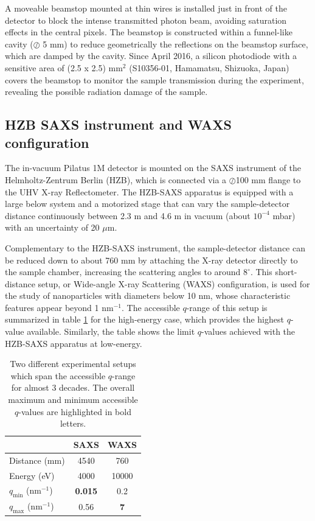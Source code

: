 A moveable beamstop mounted at thin wires is installed just in front of the detector to block the intense transmitted photon beam, avoiding saturation effects in the central pixels. The beamstop is constructed within a funnel-like cavity ($\oslash$ 5 mm) to reduce geometrically the reflections on the beamstop surface, which are damped by the cavity. Since April 2016, a silicon photodiode with a sensitive area of (2.5 x 2.5) mm$^2$ (S10356-01, Hamamatsu, Shizuoka, Japan) covers the beamstop to monitor the sample transmission during the experiment, revealing the possible radiation damage of the sample.

\subsection{HZB SAXS instrument and WAXS configuration}
\label{sec:WAXS_experimental}

The in-vacuum Pilatus 1M detector is mounted on the SAXS instrument of the Helmholtz-Zentrum Berlin (HZB), which is connected via a $\oslash$100 mm flange to the UHV X-ray Reflectometer. The HZB-SAXS apparatus is equipped with a large below system and a motorized stage that can vary the sample-detector distance continuously between 2.3 m and 4.6 m in vacuum (about $10^{-4}$ mbar) with an uncertainty of 20 $\mu$m. 

Complementary to the HZB-SAXS instrument, the sample-detector distance can be reduced down to about 760 mm by attaching the X-ray detector directly to the sample chamber, increasing the scattering angles to around $8^{\circ}$. This short-distance setup, or Wide-angle X-ray Scattering (WAXS) configuration, is used for the study of nanoparticles with diameters below 10 nm, whose characteristic features appear beyond 1 nm$^{-1}$. The accessible $q$-range of this setup is summarized in table \ref{tab:qrange} for the high-energy case, which provides the highest $q$-value available. Similarly, the table shows the limit $q$-values achieved with the HZB-SAXS apparatus at low-energy.

\begin{table}[]
\centering
\caption[Two different SAXS experimental setups and the accessible $q$-range.]{Two different experimental setups which span the accessible $q$-range for almost 3 decades. The overall maximum and minimum accessible $q$-values are highlighted in bold letters.}
\label{tab:qrange}
\begin{tabular}{|l|c|c|}
\hline
              & \textbf{SAXS} & \textbf{WAXS} \\ \hline
Distance (mm) & 4540          & 760           \\ \hline
Energy (eV)   & 4000          & 10000         \\ \hline
$q_{\text{min}}$ (nm$^{-1}$)   & \textbf{0.015}         & 0.2          \\ \hline
$q_{\text{max}}$ (nm$^{-1}$)   & 0.56             & \textbf{7}             \\ \hline
\end{tabular}
\end{table}

